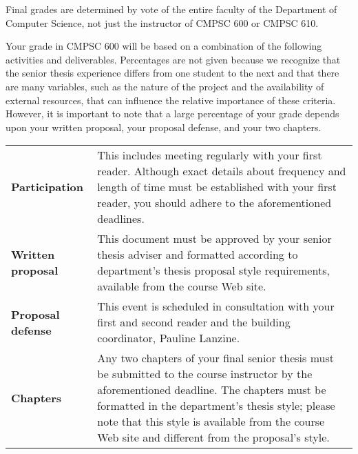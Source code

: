 Final grades are determined by vote of the entire faculty of the Department of Computer Science, not just the instructor
of CMPSC 600 or CMPSC 610.

Your grade in CMPSC 600 will be based on a combination of the following activities and deliverables. Percentages are not
given because we recognize that the senior thesis experience differs from one student to the next and that there are many
variables, such as the nature of the project and the availability of external resources, that can influence the relative
importance of these criteria. However, it is important to note that a large percentage of your grade depends upon your
written proposal, your proposal defense, and your two chapters.  

% 

\vspace*{-.05in}
\begin{center}
\begin{tabular}{lp{4in}}

\bf Participation & This includes meeting regularly with your first reader. Although exact details about frequency and
length of time must be established with your first reader, you should adhere to the aforementioned deadlines. \\

\bf Written proposal & This document must be approved by your senior thesis adviser and formatted according to
department's thesis proposal style requirements, available from the course Web site. \\

\bf Proposal defense & This event is scheduled in consultation with your first and second reader and the building
coordinator, Pauline Lanzine. \\

\bf Chapters & Any two chapters of your final senior thesis must be submitted to the course instructor by the
aforementioned deadline.  The chapters must be formatted in the department's thesis style; please note that
this style is available from the course Web site and different from the proposal's style.

\end{tabular}
\end{center}

